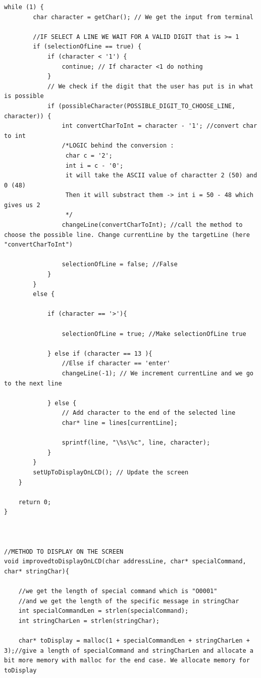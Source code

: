 \documentclass[a4paper,12pt]{article}
\begin{document}
\begin{lstlisting}[style=CStyle]
    while (1) {
        char character = getChar(); // We get the input from terminal

        //IF SELECT A LINE WE WAIT FOR A VALID DIGIT that is >= 1
        if (selectionOfLine == true) {
            if (character < '1') {
                continue; // If character <1 do nothing
            }
            // We check if the digit that the user has put is in what is possible
            if (possibleCharacter(POSSIBLE_DIGIT_TO_CHOOSE_LINE, character)) {
                int convertCharToInt = character - '1'; //convert char to int
                /*LOGIC behind the conversion :
                 char c = '2';
                 int i = c - '0';
                 it will take the ASCII value of charactter 2 (50) and 0 (48)
                 Then it will substract them -> int i = 50 - 48 which gives us 2
                 */
                changeLine(convertCharToInt); //call the method to choose the possible line. Change currentLine by the targetLine (here "convertCharToInt")
                
                selectionOfLine = false; //False
            }
        }
        else {
            
            if (character == '>'){
                
                selectionOfLine = true; //Make selectionOfLine true
                
            } else if (character == 13 ){
                //Else if character == 'enter'
                changeLine(-1); // We increment currentLine and we go to the next line
                
            } else {
                // Add character to the end of the selected line
                char* line = lines[currentLine];
                
                sprintf(line, "\%s\%c", line, character);
            }
        }
        setUpToDisplayOnLCD(); // Update the screen
    }

    return 0;
}



//METHOD TO DISPLAY ON THE SCREEN
void improvedtoDisplayOnLCD(char addressLine, char* specialCommand, char* stringChar){
    
    //we get the length of special command which is "O0001"
    //and we get the length of the specific message in stringChar
    int specialCommandLen = strlen(specialCommand);
    int stringCharLen = strlen(stringChar);
    
    char* toDisplay = malloc(1 + specialCommandLen + stringCharLen + 3);//give a length of specialCommand and stringCharLen and allocate a bit more memory with malloc for the end case. We allocate memory for toDisplay


\end{lstlisting}
\end{document}

